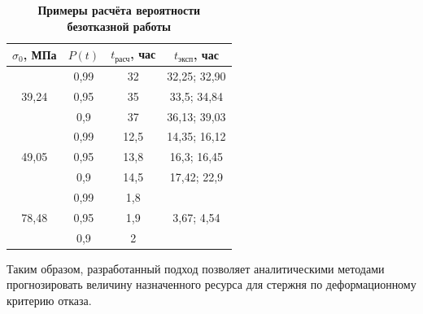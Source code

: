 \begin{table}[h!]
\centering
\begin{minipage}{8.8cm}

\centering \small
\setlength{\tabcolsep}{11pt}
\caption{\bf Примеры расчёта вероятности безотказной работы }\vspace{-3mm}
\begin{tabular}{c|c|c|c}
\hline 
\footnotesize $\sigma_0$, МПа & 
\footnotesize $P(t)$ & 
\footnotesize $t_{\text{расч}}$, час & 
\footnotesize $t_{\text{эксп}}$, час \\ 
\hline
\rule{0mm}{12pt}%
 & 0,99 & 32 & 32,25; 32,90 \\
39,24 & 0,95 & 35 & 33,5; 34,84 \\
 & 0,9\phantom{5} & 37 & 36,13; 39,03 \\
\hline
\rule{0mm}{12pt}%
 & 0,99 & 12,5 & 14,35; 16,12 \\
49,05 & 0,95 & 13,8 & 16,3; 16,45 \\
 & 0,9\phantom{5} & 14,5 & 17,42; 22,9 \\
\hline
\rule{0mm}{12pt}%
 & 0,99 & 1,8 &  \\
78,48 & 0,95 & 1,9 & 3,67; 4,54 \\
 & 0,9\phantom{5} & 2 &  \\
\hline
\end{tabular} 
\end{minipage}
\end{table}


Таким образом, разработанный подход позволяет аналитическими методами прогнозировать величину назначенного ресурса для стержня по деформационному критерию отказа.




